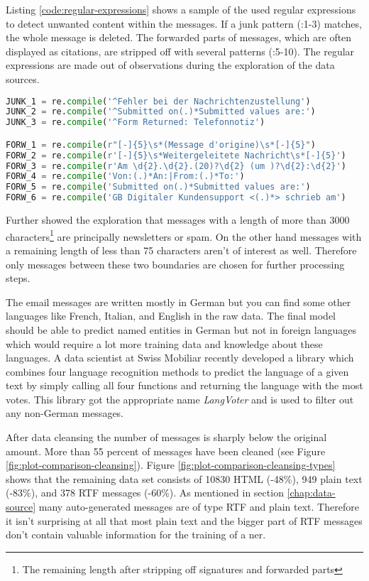 Listing \ref{code:regular-expressions} shows a sample of the used regular expressions to detect unwanted content within the messages. If a
junk pattern (:1-3) matches, the whole message is deleted. The forwarded parts of messages, which are often displayed as citations, are stripped
off with several patterns (:5-10). The regular expressions are made out of observations during the exploration of the data sources.

\begin{lstlisting}[language=Python, label={code:regular-expressions}, caption=Regular expressions for junk detection]
JUNK_1 = re.compile('^Fehler bei der Nachrichtenzustellung')
JUNK_2 = re.compile('^Submitted on(.)*Submitted values are:')
JUNK_3 = re.compile('^Form Returned: Telefonnotiz')

FORW_1 = re.compile(r"[-]{5}\s*(Message d'origine)\s*[-]{5}")
FORW_2 = re.compile(r'[-]{5}\s*Weitergeleitete Nachricht\s*[-]{5}')
FORW_3 = re.compile(r'Am \d{2}.\d{2}.(20)?\d{2} (um )?\d{2}:\d{2}')
FORW_4 = re.compile('Von:(.)*An:|From:(.)*To:')
FORW_5 = re.compile('Submitted on(.)*Submitted values are:')
FORW_6 = re.compile('GB Digitaler Kundensupport <(.)*> schrieb am')
\end{lstlisting}

Further showed the exploration that messages with a length of more than 3000 characters\footnote{The remaining length after stripping off signatures
and forwarded parts} are principally newsletters or spam. On the other hand messages with a remaining length of less than 75 characters aren't of
interest as well. Therefore only messages between these two boundaries are chosen for further processing steps.

The email messages are written mostly in German but you can find some other languages like French, Italian, and English in the raw data. The final
model should be able to predict named entities in German but not in foreign languages which would require a lot more training data and knowledge about
these languages. A data scientist at Swiss Mobiliar recently developed a library which combines four language recognition methods to predict the
language of a given text by simply calling all four functions and returning the language with the most votes. This library got the appropriate name
\emph{LangVoter} and is used to filter out any non-German messages.

After data cleansing the number of messages is sharply below the original amount. More than 55 percent of messages have been cleaned (see Figure
\ref{fig:plot-comparison-cleansing}). Figure \ref{fig:plot-comparison-cleansing-types} shows that the remaining data set consists of 10830 HTML
(-48\%), 949 plain text (-83\%), and 378 RTF messages (-60\%). As mentioned in section \ref{chap:data-source} many auto-generated messages are of
type RTF and plain text. Therefore it isn't surprising at all that most plain text and the bigger part of RTF messages don't contain valuable
information for the training of a \acrlong{ner}.

